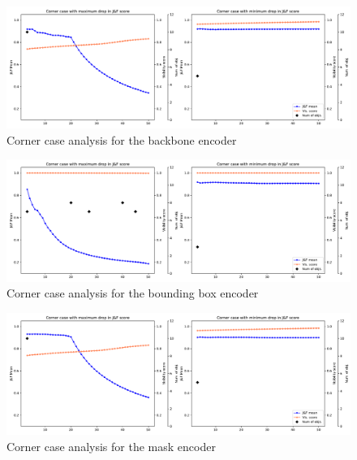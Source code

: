 \begin{figure} [ht!]
    \centering
    \includegraphics[width=1.\linewidth]{figures/04_experiments/corner_cases_ablations/9_backbone_att_fpn_fast_rotation-corner_cases.pdf}
    \caption{Corner case analysis for the backbone encoder}
    \label{fig:corner_cases1}
    
\end{figure}
\begin{figure}[ht!]
    \centering
    \includegraphics[width=1.\linewidth]{figures/04_experiments/corner_cases_ablations/5_bbox_att_fpn_fast_rotation-corner_cases.pdf}
    \caption{Corner case analysis for the bounding box encoder}
    \label{fig:corner_cases2}
    
\end{figure}



\begin{figure}[ht!]
    \centering
    \includegraphics[width=1.\linewidth]{figures/04_experiments/corner_cases_ablations/6_mask_att_fpn_fast_rotation-corner_cases.pdf}
    \caption{Corner case analysis for the mask encoder }
    \label{fig:corner_cases4}
    
\end{figure}

